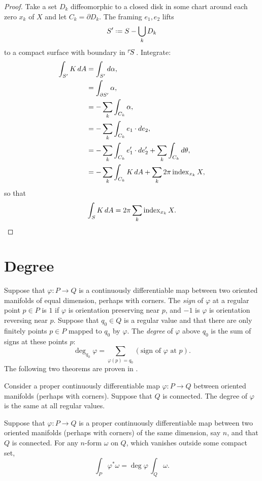\begin{proof}
Take a set \(D_k\) diffeomorphic to a closed disk in some chart around each zero \(x_k\) of \(X\) and let \(C_k=\partial D_k\).
The framing \(e_1, e_2\) lifts 
\[
S'\defeq S - \bigcup_k D_k
\]
to a compact surface with boundary in \(\left\ulcorner\!S\right.\).
Integrate:
\begin{align*}
\int_{S'} K \, dA
&= \int_{S'} d \alpha,
\\
&= \int_{\partial S'} \alpha,
\\
&= -\sum_k \int_{C_k} \alpha, \\
&= -\sum_k \int_{C_k} e_1 \cdot de_2, \\
&= -\sum_k \int_{C_k} e_1' \cdot de_2' + \sum_k \int_{C_k} d \theta,
\\
&= -\sum_k \int_{C_k} K \, dA + \sum_k 2 \pi \operatorname{index}_{x_k} X,
\end{align*}
so that
\[
\int_S K \, dA = 2 \pi \sum_k \operatorname{index}_{x_k} X.
\]
\end{proof}

\section{Degree}
Suppose that \(\varphi\colon P \to Q\) is a continuously differentiable map between two oriented manifolds of equal dimension, perhaps with corners.  
The \emph{sign}
of \(\varphi\) at a regular point \(p \in P\) is \(1\) if \(\varphi\) is orientation preserving near \(p\), and \(-1\) is \(\varphi\) is orientation reversing near \(p\).
Suppose that \(q_0 \in Q\) is a regular value and that there are only finitely points \(p \in P\) mapped to \(q_0\) by \(\varphi\).
The \emph{degree} of \(\varphi\) above \(q_0\) is the sum of signs at these points \(p\):
\[
\deg_{q_0} \varphi = \sum_{\varphi(p)=q_0} \left(\text{sign of \(\varphi\) at \(p\)}\right).
\]
The following two theorems are proven in \cite{McKay:2018}.
\begin{theorem}
Consider a proper continuously differentiable map \(\varphi\colon P \to Q\) between oriented manifolds (perhaps with corners). 
Suppose that \(Q\) is connected. 
The degree of \(\varphi\) is the same at all regular values.
\end{theorem}
\begin{theorem}
Suppose that \(\varphi\colon P \to Q\) is a proper continuously differentiable map 
between two oriented manifolds (perhaps with corners) of the same dimension, say \(n\), and that \(Q\) is connected. 
For any \(n\)-form \(\omega\) on \(Q\), which vanishes outside some compact set,
\[
\int_P \varphi^* \omega = \deg\varphi\,\int_Q \omega.
\]
\end{theorem}

